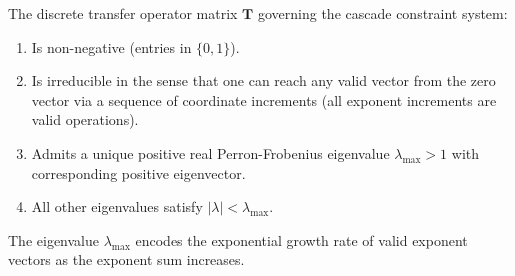 \begin{proposition}
\label{prop:cascade-spectral-pf}
The discrete transfer operator matrix $\mathbf{T}$ governing the cascade constraint system:

\begin{enumerate}
\item Is non-negative (entries in $\{0, 1\}$).
\item Is irreducible in the sense that one can reach any valid vector from the zero vector via a sequence of coordinate increments (all exponent increments are valid operations).
\item Admits a unique positive real Perron-Frobenius eigenvalue $\lambda_{\max} > 1$ with corresponding positive eigenvector.
\item All other eigenvalues satisfy $|\lambda| < \lambda_{\max}$.
\end{enumerate}

The eigenvalue $\lambda_{\max}$ encodes the exponential growth rate of valid exponent vectors as the exponent sum increases.
\end{proposition}

